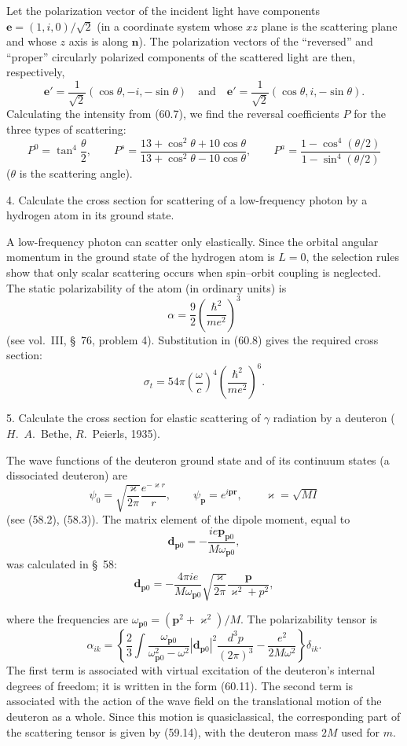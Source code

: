 Let the polarization vector of the incident light have components $\mathbf e=(1,i,0)/\sqrt2$ (in a coordinate system whose $xz$ plane is the scattering plane and whose $z$ axis is along $\mathbf n$). The polarization vectors of the ``reversed'' and ``proper'' circularly polarized components of the scattered light are then, respectively,
\[
\mathbf e'=\frac1{\sqrt2}(\cos\theta,-i,-\sin\theta)
\quad\text{and}\quad
\mathbf e'=\frac1{\sqrt2}(\cos\theta,i,-\sin\theta).
\]
Calculating the intensity from (60.7), we find the reversal coefficients $P$ for the three types of scattering:
\[
P^0=\tan^4\frac\theta2,
\qquad
P^s=\frac{13+\cos^2\theta+10\cos\theta}{13+\cos^2\theta-10\cos\theta},
\qquad
P^a=\frac{1-\cos^4(\theta/2)}{1-\sin^4(\theta/2)}
\]
($\theta$ is the scattering angle).

4. Calculate the cross section for scattering of a low-frequency photon by a hydrogen atom in its ground state.

\SolutionHeading A low-frequency photon can scatter only elastically. Since the orbital angular momentum in the ground state of the hydrogen atom is $L=0$, the selection rules show that only scalar scattering occurs when spin--orbit coupling is neglected. The static polarizability of the atom (in ordinary units) is
\[
\alpha=\frac92\left(\frac{\hbar^2}{me^2}\right)^{\!3}
\]
(see vol.~III, \S~76, problem 4). Substitution in (60.8) gives the required cross section:
\[
\sigma_t=54\pi\left(\frac{\omega}{c}\right)^{\!4}
\left(\frac{\hbar^2}{me^2}\right)^{\!6}.
\]

5. Calculate the cross section for elastic scattering of $\gamma$ radiation by a deuteron ($H$.~$A$.~Bethe, $R$.~Peierls, 1935).

\SolutionHeading The wave functions of the deuteron ground state and of its continuum states (a dissociated deuteron) are
\[
\psi_0=\sqrt{\frac{\varkappa}{2\pi}}\frac{e^{-\varkappa r}}r,
\qquad \psi_{\mathbf p}=e^{i\mathbf p\mathbf r},
\qquad \varkappa=\sqrt{MI}
\]
(see (58.2), (58.3)). The matrix element of the dipole moment, equal to
\[
\mathbf d_{\mathbf p0}=-\frac{ie\mathbf p_{\mathbf p0}}{M\omega_{\mathbf p0}},
\]
was calculated in \S~58:
\[
\mathbf d_{\mathbf p0}=-\frac{4\pi i e}{M\omega_{\mathbf p0}}
\sqrt{\frac{\varkappa}{2\pi}}\frac{\mathbf p}{\varkappa^2+p^2},
\]

where the frequencies are $\omega_{\mathbf p0}=(\mathbf p^2+\varkappa^2)/M$. The polarizability tensor is
\[
\alpha_{ik}=\left\{\frac23\int\frac{\omega_{\mathbf p0}}{\omega_{\mathbf p0}^2-\omega^2}
|\mathbf d_{\mathbf p0}|^2\frac{d^3p}{(2\pi)^3}-\frac{e^2}{2M\omega^2}\right\}\delta_{ik}.
\]
The first term is associated with virtual excitation of the deuteron's internal degrees of freedom; it is written in the form (60.11). The second term is associated with the action of the wave field on the translational motion of the deuteron as a whole. Since this motion is quasiclassical, the corresponding part of the scattering tensor is given by (59.14), with the deuteron mass $2M$ used for $m$.

